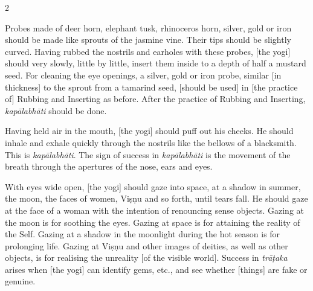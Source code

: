 \begin{nohyp}
\begin{multicols}{2}
\begin{eng}
Probes made of deer horn, elephant tusk, rhinoceros horn, silver, gold or iron should be made like sprouts of the jasmine vine. Their tips should be slightly curved. Having rubbed the nostrils and earholes with these probes, [the yogi] should very slowly, little by little, insert them inside to a depth of half a mustard seed. For cleaning the eye openings, a silver, gold or iron probe, similar [in thickness] to the sprout from a tamarind seed, [should be used] in [the practice of] Rubbing and Inserting as before.  After the practice of Rubbing and Inserting, \textit{kapālabhāti} should be done. 
\vskip 7pt


Having held air in the mouth, [the yogi] should puff out his cheeks. He should inhale and exhale quickly through the nostrils like the bellows of a blacksmith. This is \textit{kapālabhāti}. The sign of success in \textit{kapālabhāti} is the movement of the breath through the apertures of the nose, ears and eyes.
\vskip 7pt


With eyes wide open, [the yogi] should gaze into space, at a shadow in summer, the moon, the faces of women, Viṣṇu and so forth, until tears fall. He should gaze at the face of a woman with the intention of renouncing sense objects. Gazing at the moon is for soothing the eyes. Gazing at space is for attaining the reality of the Self. Gazing at a shadow in the moonlight during the hot season is for prolonging life. Gazing at Viṣṇu and other images of deities, as well as other objects, is for realising the unreality [of the visible world]. Success in \textit{trāṭaka} arises when [the yogi] can identify gems, etc., and see whether [things] are fake or genuine.
\end{eng}
\end{multicols}
\end{nohyp}

\newpage


